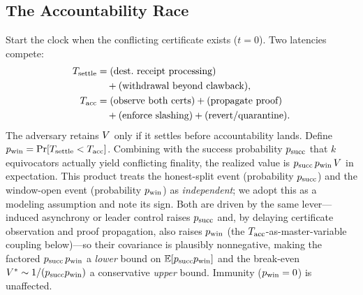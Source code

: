 \subsection{The Accountability Race}
\label{sec:race}

Start the clock when the conflicting certificate exists ($t=0$). Two latencies compete:
\begin{align*}
T_{\mathrm{settle}} &= \text{(dest.\ receipt processing)} \\
         &\quad + \text{(withdrawal beyond clawback)},\\
T_{\mathrm{acc}}    &= \text{(observe both certs)} + \text{(propagate proof)} \\
         &\quad + \text{(enforce slashing)} + \text{(revert/quarantine)}.
\end{align*}
The adversary retains $V$ only if it settles before accountability lands. Define
$p_{\mathrm{win}}=\Pr[T_{\mathrm{settle}}<T_{\mathrm{acc}}]$. Combining with the success probability $p_{\mathrm{succ}}$ that $k$ equivocators
actually yield conflicting finality, the realized value is $p_{\mathrm{succ}}\,p_{\mathrm{win}}\,V$ in expectation. This
product treats the honest-split event (probability $p_{\mathrm{succ}}$) and the window-open event (probability
$p_{\mathrm{win}}$) as \emph{independent}; we adopt this as a modeling assumption and note its sign. Both are
driven by the same lever---induced asynchrony or leader control raises $p_{\mathrm{succ}}$ and, by delaying
certificate observation and proof propagation, also raises $p_{\mathrm{win}}$ (the $T_{\mathrm{acc}}$-as-master-variable
coupling below)---so their covariance is plausibly nonnegative, making the factored $p_{\mathrm{succ}}\,p_{\mathrm{win}}$ a
\emph{lower} bound on $\mathbb{E}[p_{\mathrm{succ}}p_{\mathrm{win}}]$ and the break-even $V^{*}\sim1/(p_{\mathrm{succ}}p_{\mathrm{win}})$ a
conservative \emph{upper} bound. Immunity ($p_{\mathrm{win}}=0$) is unaffected.

